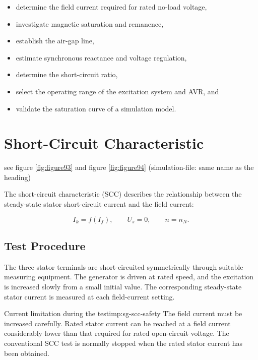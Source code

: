 \begin{itemize}
	\item determine the field current required for rated no-load voltage,
	\item investigate magnetic saturation and remanence,
	\item establish the air-gap line,
	\item estimate synchronous reactance and voltage regulation,
	\item determine the short-circuit ratio,
	\item select the operating range of the excitation system and AVR, and
	\item validate the saturation curve of a simulation model.
\end{itemize}

\section{Short-Circuit Characteristic} see figure \ref{fig:figure93} and figure \ref{fig:figure94}  (simulation-file: same name as the heading) 
\label{sec:sg-scc}

The short-circuit characteristic (SCC) describes the relationship between the
steady-state stator short-circuit current and the field current:

\begin{equation}
  I_k=f(I_f),
  \qquad U_s=0,
  \qquad n=n_N.
  \label{eq:sg-scc-definition}
\end{equation}

\subsection{Test Procedure}

The three stator terminals are short-circuited symmetrically through suitable
measuring equipment. The generator is driven at rated speed, and the
excitation is increased slowly from a small initial value. The corresponding
steady-state stator current is measured at each field-current setting.

\begin{important}{Current limitation during the test}{imp:sg-scc-safety}
The field current must be increased carefully. Rated stator current can be
reached at a field current considerably lower than that required for rated
open-circuit voltage. The conventional SCC test is normally stopped when the
rated stator current has been obtained.
\end{important}

